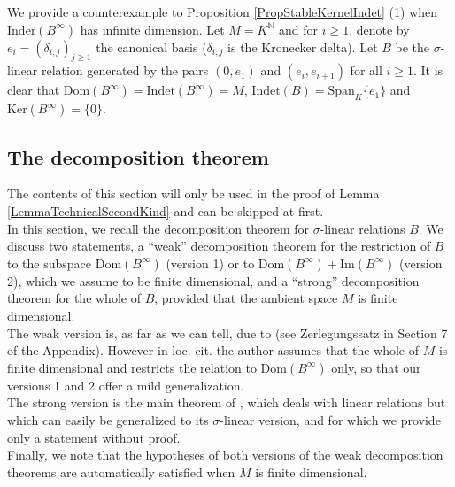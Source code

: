 \documentclass[12pt]{amsart}
\theoremstyle{definition}
\newcommand{\<}{\langle}   %
\renewcommand{\>}{\rangle} %
\begin{document}
We provide a counterexample to Proposition \ref{PropStableKernelIndet} (1) when $\mathrm{Inder}(B^{\infty})$ has infinite dimension. Let $M = K^{\mathbb N}$ and for $i\geq 1$, denote by $e_i = (\delta_{i,j})_{j\geq 1}$ the canonical basis ($\delta_{i,j}$ is the Kronecker delta). Let $B$ be the $\sigma$-linear relation generated by the pairs $(0,e_1)$ and $(e_i,e_{i+1})$ for all $i\geq 1$. It is clear that $\mathrm{Dom}(B^{\infty}) = \mathrm{Indet}(B^{\infty}) = M$, $\mathrm{Indet}(B) = \mathrm{Span}_K\{e_1\}$ and $\mathrm{Ker}(B^{\infty}) = \{0\}$.

\subsection{The decomposition theorem}

The contents of this section will only be used in the proof of Lemma \ref{LemmaTechnicalSecondKind} and can be skipped at first.\\

In this section, we recall the decomposition theorem for $\sigma$-linear relations $B$. We discuss two statements, a ``weak'' decomposition theorem for the restriction of $B$ to the subspace $\mathrm{Dom}(B^{\infty})$ (version 1) or to $\mathrm{Dom}(B^{\infty}) + \mathrm{Im}(B^{\infty})$ (version 2), which we assume to be finite dimensional, and a ``strong'' decomposition theorem for the whole of $B$, provided that the ambient space $M$ is finite dimensional.\\
The weak version is, as far as we can tell, due to \cite{kraft:1975} (see Zerlegungssatz in Section 7 of the Appendix). However in loc. cit. the author assumes that the whole of $M$ is finite dimensional and restricts the relation to $\mathrm{Dom}(B^{\infty})$ only, so that our versions 1 and 2 offer a mild generalization.\\
The strong version is the main theorem of \cite{towber:1971}, which deals with linear relations but which can easily be generalized to its $\sigma$-linear version, and for which we provide only a statement without proof. \\
Finally, we note that the hypotheses of both versions of the weak decomposition theorems are automatically satisfied when $M$ is finite dimensional.
\end{document}

